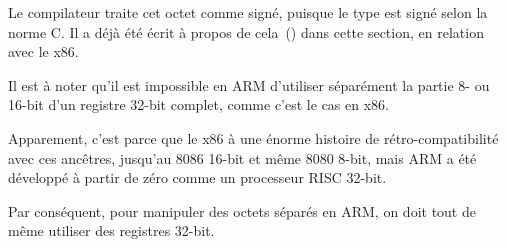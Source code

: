 Le compilateur traite cet octet comme signé, puisque le type \Tchar est signé selon
la norme C.
Il a déjà été écrit à propos de cela~() dans cette section, en relation
avec le x86.


Il est à noter qu'il est impossible en ARM d'utiliser séparément la partie 8- ou
16-bit d'un registre 32-bit complet, comme c'est le cas en x86.

Apparement, c'est parce que le x86 à une énorme histoire de rétro-compatibilité
avec ces ancêtres, jusqu'au 8086 16-bit et même 8080 8-bit, mais ARM a été développé
à partir de zéro comme un processeur RISC 32-bit.

Par conséquent, pour manipuler des octets séparés en ARM, on doit tout de même utiliser
des registres 32-bit.






